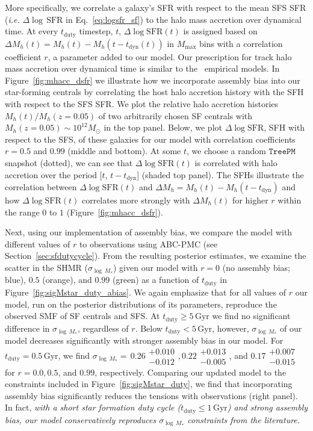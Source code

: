 \documentclass[12pt, letterpaper, preprint, tighten]{aastex62}
\newcommand{\logsfr}{\log\mathrm{SFR}}
\begin{document}
More specifically, we correlate a galaxy's SFR with respect to the mean SFS 
SFR (\emph{i.e.} $\Delta\log\,\mathrm{SFR}$ in Eq.~\ref{eq:logsfr_sf}) to the 
halo mass accretion over dynamical time. At every $t_\mathrm{duty}$ timestep, 
$t$, $\Delta\logsfr(t)$ is assigned based on 
$\Delta M_h(t) = M_h(t) - M_h(t - t_\mathrm{dyn}(t))$ in $M_\mathrm{max}$ bins 
with a correlation coefficient $r$, a parameter added to our model. Our 
prescription for track halo mass accretion over dynamical time is similar to 
the~\cite{rodriguez-puebla2016,behroozi2018a} empirical models. In 
Figure~\ref{fig:mhacc_dsfr} we illustrate how we incorporate assembly bias into 
our star-forming centrals by correlating the host halo accretion history 
with the SFH with respect to the SFS SFR. We plot the relative halo
accretion histories $M_h(t)/M_h(z{=}0.05)$ of two arbitrarily chosen SF centrals 
with $M_h(z{=}0.05)\sim10^{12}M_\odot$ in the top panel. Below, we plot 
$\Delta\logsfr$, SFH with respect to the SFS, of these galaxies 
for our model with correlation coefficients $r=0.5$ and $0.99$ (middle and bottom). 
At some $t$, we choose a random $\mathtt{TreePM}$ snapshot (dotted), we can see 
that $\Delta\logsfr(t)$ is correlated with halo accretion over the 
period [$t$, $t - t_\mathrm{dyn}$] (shaded top panel). The SFHs illustrate the
correlation between $\Delta\logsfr(t)$ and 
$\Delta M_h = M_h(t) - M_h(t-t_\mathrm{dyn})$ and how $\Delta\logsfr(t)$
correlates more strongly with $\Delta M_h(t)$ for higher $r$ within the 
range $0$ to $1$ (Figure~\ref{fig:mhacc_dsfr}). 

Next, using our implementation of assembly bias, we compare the model with 
different values of $r$ to observations using ABC-PMC (see Section~\ref{sec:sfdutycycle}). 
From the resulting posterior estimates, we examine the scatter in the SHMR 
($\sigma_{\log\,M_*}$) given our model %
with $r=0$ (no assembly bias; blue), $0.5$ (orange), and $0.99$ (green) as a 
function of $t_\mathrm{duty}$ in Figure~\ref{fig:sigMstar_duty_abias}. We 
again emphasize that for all values of $r$ our model, run on the posterior 
distributions of its parameters, reproduce the observed SMF of SF centrals 
and SFS.  
At $t_\mathrm{duty}{\geq}5\,\mathrm{Gyr}$ we find no significant difference 
in $\sigma_{\log\,M_*}$, regardless of $r$. Below $t_\mathrm{duty} < 5\,\mathrm{Gyr}$, 
however, $\sigma_{\log\,M_*}$ of our model decreases significantly with 
stronger assembly bias in our model. For $t_\mathrm{duty} = 0.5\,\mathrm{Gyr}$, 
{\color{red}
we find $\sigma_{\log\,M_*}{=}\,0.26\substack{+0.010\\-0.012}, 
0.22\substack{+0.013\\-0.005}$, and $0.17\substack{+0.007\\-0.015} $ 
}
for $r{=}0.0, 0.5$, and 
$0.99$, respectively. Comparing our updated model to the constraints included 
in Figure~\ref{fig:sigMstar_duty}, we find that incorporating assembly bias 
significantly reduces the tensions with observations (right panel). In fact, 
\emph{with a short star formation duty cycle ($t_\mathrm{duty} \leq 1\,\mathrm{Gyr}$) 
and strong assembly bias, our model conservatively reproduces 
$\sigma_{\log\,M_*}$ constraints from the literature.}
\end{document}
